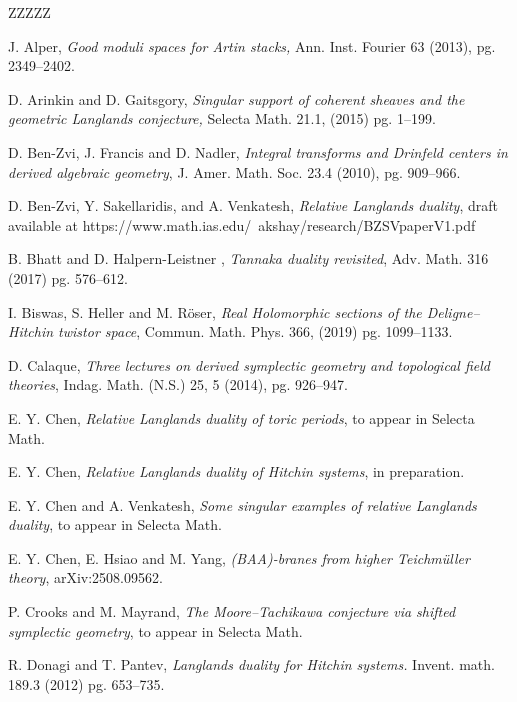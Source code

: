 \documentclass[11pt, a4paper]{amsart}
\numberwithin{equation}{section}
\theoremstyle{definition}
\theoremstyle{remark}
\begin{document}
\begin{thebibliography}{ZZZZZ}

J. Alper, 
\textit{Good moduli spaces for Artin stacks,}
Ann. Inst. Fourier 63 (2013), pg. 2349--2402.

D. Arinkin and D. Gaitsgory,
\textit{Singular support of coherent sheaves and the geometric Langlands conjecture,} 
Selecta Math. 21.1, (2015) pg. 1--199.

D. Ben-Zvi, J. Francis and D. Nadler,
\textit{Integral transforms and Drinfeld centers in derived algebraic geometry}, 
J. Amer. Math. Soc. 23.4 (2010), pg. 909--966.

D. Ben-Zvi, Y. Sakellaridis, and A. Venkatesh,
\textit{Relative Langlands duality}, 
draft available at https://www.math.ias.edu/~akshay/research/BZSVpaperV1.pdf

B. Bhatt and D. Halpern-Leistner ,
\textit{Tannaka duality revisited}, 
Adv. Math. 316 (2017) pg. 576--612.

I. Biswas, S. Heller and M. R\"oser,
\textit{Real Holomorphic sections of the Deligne–Hitchin twistor space}, 
Commun. Math. Phys. 366, (2019) pg. 1099--1133.

D. Calaque,
\textit{Three lectures on derived symplectic geometry and topological field theories},
Indag. Math. (N.S.) 25, 5 (2014),
pg. 926--947. 


E. Y. Chen,
\textit{Relative Langlands duality of toric periods}, to appear in Selecta Math.


E. Y. Chen,
\textit{Relative Langlands duality of Hitchin systems},
in preparation. 

E. Y. Chen and A. Venkatesh,
\textit{Some singular examples of relative Langlands duality}, to appear in Selecta Math. 

E. Y. Chen, E. Hsiao  and M. Yang,
\textit{(BAA)-branes from higher Teichmüller theory}, arXiv:2508.09562.

P. Crooks and M. Mayrand,
\textit{The Moore--Tachikawa conjecture via shifted symplectic geometry}, to appear in Selecta Math. 

R. Donagi and T. Pantev, 
\textit{Langlands duality for Hitchin systems.}
Invent. math. 189.3 (2012) pg. 653--735. 


\end{thebibliography}
\end{document}
